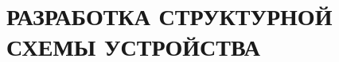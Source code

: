 \begin{sloppypar} %
\newpage %
\section{РАЗРАБОТКА СТРУКТУРНОЙ СХЕМЫ УСТРОЙСТВА} %


\end{sloppypar}
